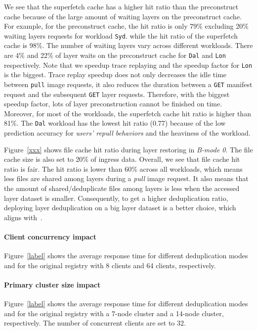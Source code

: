 We see that the superfetch cache has a higher hit ratio than the preconstruct cache
because of the large amount of waiting layers on the preconstruct cache.
For example, for the preconstruct cache, 
the hit ratio is only 79\% excluding 20\% waiting layers requests for workload \texttt{Syd}.
while the hit ratio of the superfetch cache is 98\%.
The number of waiting layers vary across different workloads.
There are 4\% and 22\% of layer waits on the preconstruct cache for \texttt{Dal} and \texttt{Lon} respectively. 
Note that we speedup trace replaying
and the speedup factor for \texttt{Lon} is the biggest.
Trace replay speedup does not only decreases the idle time between \texttt{pull} image requests, it also reduces the duration between a \texttt{GET} manifest request and the subsequent \texttt{GET} layer requests.
Therefore, with the biggest speedup factor,
lots of layer preconstruction cannot be finished on time.
Moreover, for most of the workloads, the superfetch cache hit ratio is higher than 81\%. 
The \texttt{Dal} workload has the lowest hit ratio (0.77) because of the low prediction accuracy for \emph{users' repull behaviors} 
and the heaviness of the workload.

Figure~\ref{xxx} shows file cache hit ratio during layer restoring in \emph{B-mode 0}.
The file cache size is also set to 20\% of ingress data.
Overall, we see that file cache hit ratio is fair.
The hit ratio is lower than 60\% across all workloads, which means less files are shared among layers during a \emph{pull} image request.
It also means that the amount of shared/deduplicate files among layers is less when the accessed layer dataset is smaller.
Consequently, to get a higher deduplication ratio, deploying layer deduplication on a big layer dataset is a better choice, which aligns with~\cite{dedupanalysis}.




\paragraph{Client concurrency impact}
Figure~\ref{label} shows the average response time for different deduplication modes and for the original registry with 8 clients and 64 clients, respectively.

\paragraph{Primary cluster size  impact}
Figure~\ref{label} shows the average response time for different deduplication modes and for the original registry with a 7-node cluster and a 14-node cluster, respectively.
The number of concurrent clients are set to 32.



